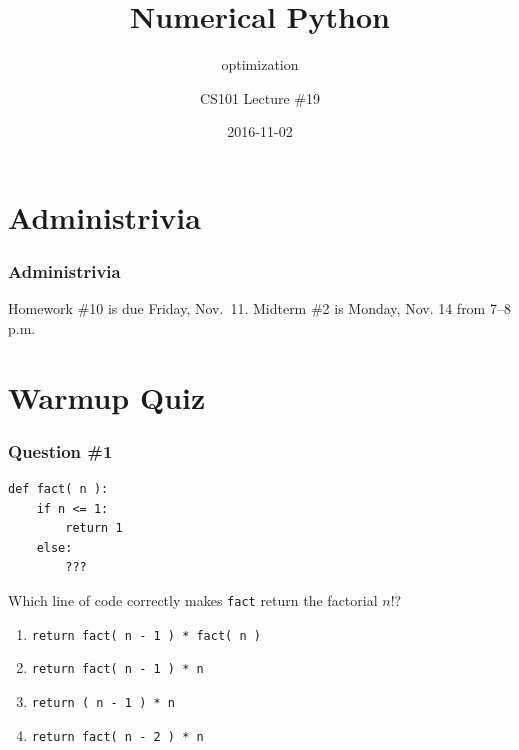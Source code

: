 \documentclass[11pt]{beamer}
\title{Numerical Python}
\subtitle{optimization}
\author{CS101 Lecture \#19}
\date{2016-11-02}
\begin{document}
  \setcounter{showProgressBar}{0}
  \setcounter{showSlideNumbers}{0}

\frame{\titlepage}

\setcounter{framenumber}{0}
\setcounter{showProgressBar}{1}
\setcounter{showSlideNumbers}{1}

\section{Administrivia}

\begin{frame}
  \frametitle{Administrivia}
  \Enlarge

  \begin{itemize}
  \myitem  Homework \#10 is due Friday, Nov.\ 11.
  \myitem  Midterm \#2 is Monday, Nov. 14 from 7–8 p.m.
  \end{itemize}
\end{frame}

\section{Warmup Quiz}

\begin{frame}[fragile]
  \frametitle{Question \#1}

  \begin{Verbatim}
def fact( n ):
    if n <= 1:
        return 1
    else:
        ???
  \end{Verbatim}

Which line of code correctly makes \texttt{fact} return the factorial $n!$?

  \begin{enumerate}[label=\Alph*]
    \item  \texttt{return fact( n - 1 ) * fact( n )}
    \item  \texttt{return fact( n - 1 ) * n}
    \item  \texttt{return ( n - 1 ) * n}
    \item  \texttt{return fact( n - 2 ) * n}
  \end{enumerate}
\end{frame}
\end{document}
